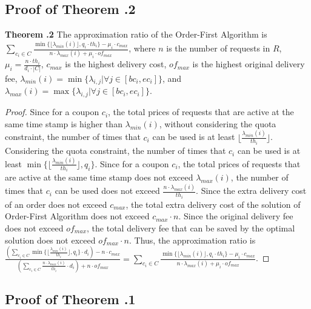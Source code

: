 \subsection{Proof of Theorem \uppercase\expandafter{}.2}

\noindent\textbf{Theorem \uppercase\expandafter{}.2}
The approximation ratio of the Order-First Algorithm is $\sum\limits_{c_i \in C} \frac{ \min \{\lfloor \lambda_{min}(i) \rfloor, q_i \cdot th_i\} - \mu_i \cdot c_{max}}{n \cdot \lambda_{max}(i) + \mu_i \cdot of_{max}}$, where $n$ is the number of requests in $R$, $\mu_i = \frac{n \cdot th_i}{d_i \cdot |C|}$, $c_{max}$ is the highest delivery cost, $of_{max}$ is the highest original delivery fee, $\lambda_{min}(i) = \min\{\lambda_{i, j} | \forall j \in [bc_i, ec_i]\}$, and $\lambda_{max}(i) = \max\{\lambda_{i, j} | \forall j \in [bc_i, ec_i]\}$.

\begin{proof}
	Since for a coupon $c_i$, the total prices of requests that are active at the same time stamp is higher than $\lambda_{min}(i)$, without considering the quota constraint, the number of times that $c_i$ can be used is at least $\lfloor \frac{\lambda_{min}(i)}{th_i} \rfloor$. Considering the quota constraint, the number of times that $c_i$ can be used is at least $\min \{\lfloor \frac{\lambda_{min}(i)}{th_i} \rfloor, q_i\}$. Since for a coupon $c_i$, the total prices of requests that are active at the same time stamp does not exceed $\lambda_{max}(i)$, the number of times that $c_i$ can be used does not exceed $\frac{n \cdot \lambda_{max}(i)}{th_i}$. Since the extra delivery cost of an order does not exceed $c_{max}$, the total extra delivery cost of the solution of Order-First Algorithm does not exceed $c_{max} \cdot n$. Since the original delivery fee does not exceed $of_{max}$, the total delivery fee that can be saved by the optimal solution does not exceed $of_{max} \cdot n$. Thus, the approximation ratio is $\frac{(\sum_{c_i \in C}\min \{\lfloor \frac{\lambda_{min}(i)}{th_i} \rfloor, q_i\} \cdot d_i) - n \cdot c_{max}}{(\sum_{c_i \in C} \frac{n \cdot \lambda_{max}(i)}{th_i} \cdot d_i) + n \cdot of_{max}} = \sum\limits_{c_i \in C} \frac{ \min \{\lfloor \lambda_{min}(i) \rfloor, q_i \cdot th_i\} - \mu_i \cdot c_{max}}{n \cdot \lambda_{max}(i) + \mu_i \cdot of_{max}}$.
\end{proof}

\subsection{Proof of Theorem \uppercase\expandafter{}.1}

